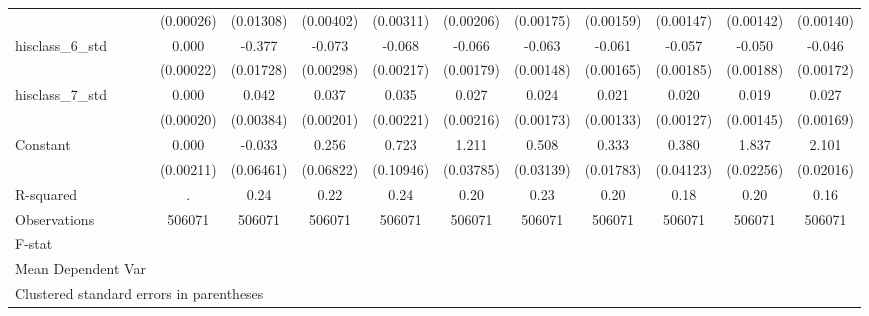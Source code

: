 {\begin{tabular}{l*{10}{c}}
                    &   (0.00026)         &   (0.01308)         &   (0.00402)         &   (0.00311)         &   (0.00206)         &   (0.00175)         &   (0.00159)         &   (0.00147)         &   (0.00142)         &   (0.00140)         \\
hisclass\_6\_std      &       0.000         &      -0.377\sym{***}&      -0.073\sym{***}&      -0.068\sym{***}&      -0.066\sym{***}&      -0.063\sym{***}&      -0.061\sym{***}&      -0.057\sym{***}&      -0.050\sym{***}&      -0.046\sym{***}\\
                    &   (0.00022)         &   (0.01728)         &   (0.00298)         &   (0.00217)         &   (0.00179)         &   (0.00148)         &   (0.00165)         &   (0.00185)         &   (0.00188)         &   (0.00172)         \\
hisclass\_7\_std      &       0.000         &       0.042\sym{***}&       0.037\sym{***}&       0.035\sym{***}&       0.027\sym{***}&       0.024\sym{***}&       0.021\sym{***}&       0.020\sym{***}&       0.019\sym{***}&       0.027\sym{***}\\
                    &   (0.00020)         &   (0.00384)         &   (0.00201)         &   (0.00221)         &   (0.00216)         &   (0.00173)         &   (0.00133)         &   (0.00127)         &   (0.00145)         &   (0.00169)         \\
Constant            &       0.000         &      -0.033         &       0.256\sym{***}&       0.723\sym{***}&       1.211\sym{***}&       0.508\sym{***}&       0.333\sym{***}&       0.380\sym{***}&       1.837\sym{***}&       2.101\sym{***}\\
                    &   (0.00211)         &   (0.06461)         &   (0.06822)         &   (0.10946)         &   (0.03785)         &   (0.03139)         &   (0.01783)         &   (0.04123)         &   (0.02256)         &   (0.02016)         \\
\hline
R-squared           &           .         &        0.24         &        0.22         &        0.24         &        0.20         &        0.23         &        0.20         &        0.18         &        0.20         &        0.16         \\
Observations        &      506071         &      506071         &      506071         &      506071         &      506071         &      506071         &      506071         &      506071         &      506071         &      506071         \\
F-stat              &                     &                     &                     &                     &                     &                     &                     &                     &                     &                     \\
Mean Dependent Var  &                     &                     &                     &                     &                     &                     &                     &                     &                     &                     \\
\hline\hline
\multicolumn{11}{l}{\footnotesize Clustered standard errors in parentheses}\\
\end{tabular}
}
